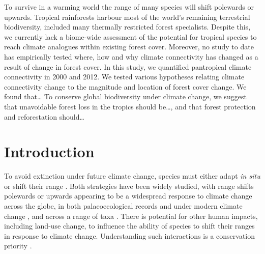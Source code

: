 \documentclass[12pt,a4paper,]{report}
\theoremstyle{definition}
\theoremstyle{definition}
\theoremstyle{definition}
\theoremstyle{remark}
\begin{document}
To survive in a warming world the range of many species will shift
polewards or upwards. Tropical rainforests harbour most of the world's
remaining terrestrial biodiversity, included many thermally restricted
forest specialists. Despite this, we currently lack a biome-wide
assessment of the potential for tropical species to reach climate
analogues within existing forest cover. Moreover, no study to date has
empirically tested where, how and why climate connectivity has changed
as a result of change in forest cover. In this study, we quantified
pantropical climate connectivity in 2000 and 2012. We tested various
hypotheses relating climate connectivity change to the magnitude and
location of forest cover change. We found that\ldots{} To conserve
global biodiversity under climate change, we suggest that unavoidable
forest loss in the tropics should be\ldots{}, and that forest protection
and reforestation should\ldots{}

\section{Introduction}\label{introduction-3}

To avoid extinction under future climate change, species must either
adapt \emph{in situ} or shift their range \citep{hobbs_movers_2018}.
Both strategies have been widely studied, with range shifts polewards or
upwards appearing to be a widespread response to climate change across
the globe, in both palaeoecological records and under modern climate
change \citep{parmesan_ecological_2006, davis_range_2001}, and across a
range of taxa
\citep{chen_elevation_2009, freeman_rapid_2014, raxworthy_extinction_2008}.
There is potential for other human impacts, including land-use change,
to influence the ability of species to shift their ranges in response to
climate change. Understanding such interactions is a conservation
priority
\citep{brook_synergies_2008, mantyka-pringle_interactions_2012, sirami_impacts_2017, titeux_global_2017}.
\end{document}
